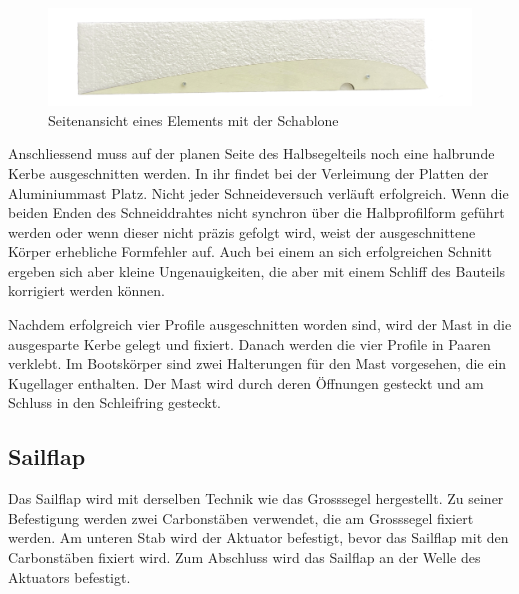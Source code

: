 \begin{figure}[H]
    \centering
    \includegraphics[width=1\linewidth]{assets/template_on_foam.png}
    
    \caption{Seitenansicht eines Elements mit der Schablone}
    \label{fig:enter-label}
\end{figure}

Anschliessend muss auf der planen Seite des Halbsegelteils noch eine halbrunde Kerbe ausgeschnitten werden. In ihr findet bei der Verleimung der Platten der Aluminiummast Platz. Nicht jeder Schneideversuch verläuft erfolgreich. Wenn die beiden Enden des Schneiddrahtes nicht synchron über die Halbprofilform geführt werden oder wenn dieser nicht präzis gefolgt wird, weist der ausgeschnittene Körper erhebliche Formfehler auf. Auch bei einem an sich erfolgreichen Schnitt ergeben sich aber kleine Ungenauigkeiten, die aber mit einem Schliff des Bauteils korrigiert werden können. 

Nachdem erfolgreich vier Profile ausgeschnitten worden sind, wird der Mast in die ausgesparte Kerbe gelegt und fixiert. Danach werden die vier Profile in Paaren verklebt. Im Bootskörper sind zwei Halterungen für den Mast vorgesehen, die ein Kugellager enthalten. Der Mast wird durch deren Öffnungen gesteckt und am Schluss in den Schleifring gesteckt.
\subsection{Sailflap}
Das Sailflap wird mit derselben Technik wie das Grosssegel hergestellt. Zu seiner Befestigung werden zwei Carbonstäben verwendet, die am Grosssegel fixiert werden. Am unteren Stab wird der Aktuator befestigt, bevor das Sailflap mit den Carbonstäben fixiert wird. Zum Abschluss wird das Sailflap an der Welle des Aktuators befestigt.